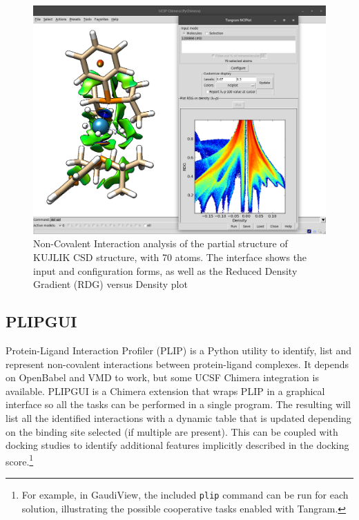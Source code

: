 \begin{figure}
	\begin{Center}
		\includegraphics[width=\textwidth]{./figures/05/tangram_nciplot.png}
		\caption[Tangram NCIPlotGUI]{Non-Covalent Interaction analysis of the partial structure of KUJLIK CSD structure, with 70 atoms. The interface shows the input and configuration forms, as well as the Reduced Density Gradient (RDG) versus Density plot}
		\label{fig:tangram-nciplot}
	\end{Center}
\end{figure}

\subsection{PLIPGUI}
Protein-Ligand Interaction Profiler (PLIP)\cite{salentin2015plip} is a Python utility to identify, list and represent non-covalent interactions between protein-ligand complexes. It depends on OpenBabel and VMD to work, but some UCSF Chimera integration is available. PLIPGUI is a Chimera extension that wraps PLIP in a graphical interface so all the tasks can be performed in a single program. The resulting will list all the identified interactions with a dynamic table that is updated depending on the binding site selected (if multiple are present). This can be coupled with docking studies to identify additional features implicitly described in the docking score.\footnote{For example, in GaudiView, the included \texttt{plip} command can be run for each solution, illustrating the possible cooperative tasks enabled with Tangram.}

